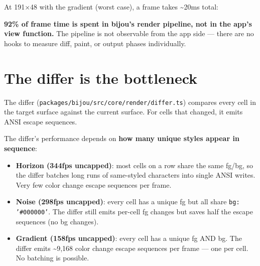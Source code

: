 At 191×48 with the gradient (worst case), a frame takes \textasciitilde20ms total:



\textbf{92\% of frame time is spent in bijou's render pipeline, not in the app's view function.} The pipeline is not observable from the app side --- there are no hooks to measure diff, paint, or output phases individually.

\section{The differ is the bottleneck}\label{record-156-the-differ-is-the-bottleneck}

The differ (\texttt{p\allowbreak{}a\allowbreak{}c\allowbreak{}k\allowbreak{}a\allowbreak{}g\allowbreak{}e\allowbreak{}s\allowbreak{}/\allowbreak{}b\allowbreak{}i\allowbreak{}j\allowbreak{}o\allowbreak{}u\allowbreak{}/\allowbreak{}s\allowbreak{}r\allowbreak{}c\allowbreak{}/\allowbreak{}c\allowbreak{}o\allowbreak{}r\allowbreak{}e\allowbreak{}/\allowbreak{}r\allowbreak{}e\allowbreak{}n\allowbreak{}d\allowbreak{}e\allowbreak{}r\allowbreak{}/\allowbreak{}d\allowbreak{}i\allowbreak{}f\allowbreak{}f\allowbreak{}e\allowbreak{}r\allowbreak{}.\allowbreak{}t\allowbreak{}s}) compares every cell in the target surface against the current surface. For cells that changed, it emits ANSI escape sequences.

The differ's performance depends on \textbf{how many unique styles appear in sequence}:

\begin{itemize}
\tightlist
\item
  \textbf{Horizon (344fps uncapped)}: most cells on a row share the same fg/bg, so the differ batches long runs of same-styled characters into single ANSI writes. Very few color change escape sequences per frame.
\item
  \textbf{Noise (298fps uncapped)}: every cell has a unique fg but all share \texttt{b\allowbreak{}g\allowbreak{}:\allowbreak{} \allowbreak{}'\allowbreak{}\#\allowbreak{}0\allowbreak{}0\allowbreak{}0\allowbreak{}0\allowbreak{}0\allowbreak{}0\allowbreak{}'}. The differ still emits per-cell fg changes but saves half the escape sequences (no bg changes).
\item
  \textbf{Gradient (158fps uncapped)}: every cell has a unique fg AND bg. The differ emits \textasciitilde9,168 color change escape sequences per frame --- one per cell. No batching is possible.
\end{itemize}

